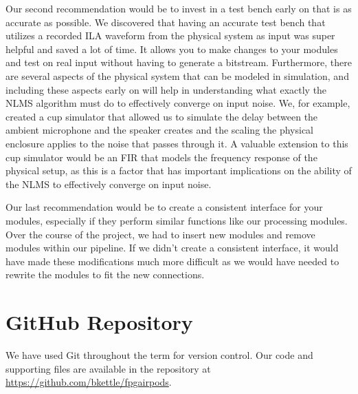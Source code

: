 \documentclass{fpgairpods}
\begin{document}
Our second recommendation would be to invest in a test bench early on that is as accurate as possible. We discovered that having an accurate test bench that utilizes a recorded ILA waveform from the physical system as input was super helpful and saved a lot of time. It allows you to make changes to your modules and test on real input without having to generate a bitstream. Furthermore, there are several aspects of the physical system that can be modeled in simulation, and including these aspects early on will help in understanding what exactly the NLMS algorithm must do to effectively converge on input noise. We, for example, created a cup simulator that allowed us to simulate the delay between the ambient microphone and the speaker creates and the scaling the physical enclosure applies to the noise that passes through it. A valuable extension to this cup simulator would be an FIR that models the frequency response of the physical setup, as this is a factor that has important implications on the ability of the NLMS to effectively converge on input noise.

Our last recommendation would be to create a consistent interface for your modules, especially if they perform similar functions like our processing modules. Over the course of the project, we had to insert new modules and remove modules within our pipeline. If we didn't create a consistent interface, it would have made these modifications much more difficult as we would have needed to rewrite the modules to fit the new connections.

\appendix
\section{GitHub Repository}
We have used Git throughout the term for version control. Our code and supporting files are available in the repository at \url{https://github.com/bkettle/fpgairpods}.

\printbibliography
\end{document}
